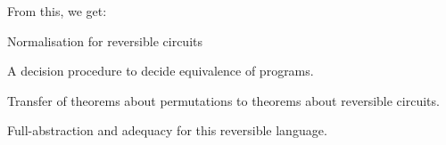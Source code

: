 \documentclass[aspectratio=169,9pt]{beamer}
\begin{document}
\begin{frame}
  From this, we get:
  \begin{plist}
    \item Normalisation for reversible circuits
    \item A decision procedure to decide equivalence of programs.
    \item Transfer of theorems about permutations to theorems about reversible circuits.
    \item Full-abstraction and adequacy for this reversible language.
  \end{plist}
\end{frame}
\end{document}
